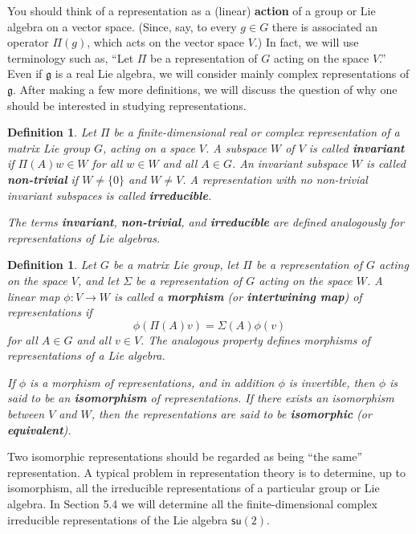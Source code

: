 \documentclass[12pt]{amsbook}
\let \frak = \mathfrak
\theoremstyle{plain}
\newtheorem{definition}[theorem]{Definition}
\numberwithin{equation}{chapter}
\numberwithin{theorem}{chapter}
\begin{document}
You should think of a representation as a (linear) \textbf{action} of a group
or Lie algebra on a vector space. (Since, say, to every $g\in G$ there is
associated an operator $\Pi(g)$, which acts on the vector space $V$.) In fact,
we will use terminology such as, ``Let $\Pi$ be a representation of $G$ acting
on the space $V$.'' Even if $\frak{g}$ is a real Lie algebra, we will consider
mainly complex representations of $\frak{g}$. After making a few more
definitions, we will discuss the question of why one should be interested in
studying representations.

\begin{definition}
Let $\Pi$ be a finite-dimensional real or complex representation of a matrix
Lie group $G$, acting on a space $V$. A subspace $W$ of $V$ is called
\textbf{invariant} if $\Pi(A)w\in W$ for all $w\in W$ and all $A\in G$. An
invariant subspace $W$ is called \textbf{non-trivial} if $W\neq\{0\}$ and
$W\neq V$. A representation with no non-trivial invariant subspaces is called
\textbf{irreducible}.

The terms \textbf{invariant}, \textbf{non-trivial}, and \textbf{irreducible}
are defined analogously for representations of Lie algebras.
\end{definition}

\begin{definition}
Let $G$ be a matrix Lie group, let $\Pi$ be a representation of $G$ acting on
the space $V$, and let $\Sigma$ be a representation of $G$ acting on the space
$W$. A linear map $\phi:V\rightarrow W$ is called a \textbf{morphism} (or
\textbf{intertwining map}) of representations if
\[
\phi(\Pi(A)v)=\Sigma(A)\phi(v)
\]
for all $A\in G$ and all $v\in V$. The analogous property defines morphisms of
representations of a Lie algebra.

If $\phi$ is a morphism of representations, and in addition $\phi$ is
invertible, then $\phi$ is said to be an \textbf{isomorphism} of
representations. If there exists an isomorphism between $V$ and $W$, then the
representations are said to be \textbf{isomorphic} (or \textbf{equivalent}).
\end{definition}

Two isomorphic representations should be regarded as being ``the same''
representation. A typical problem in representation theory is to determine, up
to isomorphism, all the irreducible representations of a particular group or
Lie algebra. In Section 5.4 we will determine all the finite-dimensional
complex irreducible representations of the Lie algebra $\mathsf{su}(2)$.
\end{document}
